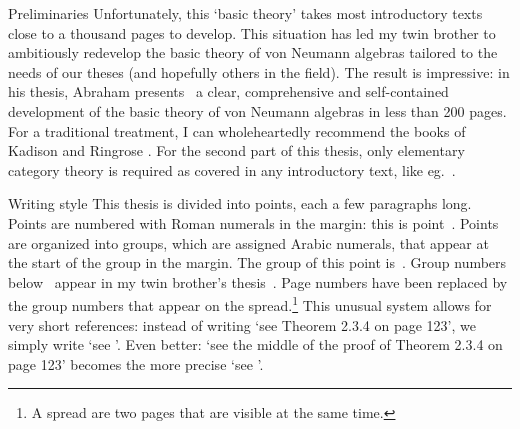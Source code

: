 \documentclass[b]{subfiles}
\begin{document}
\begin{parsec}
\begin{point}{Preliminaries}
Unfortunately, this `basic theory' takes most introductory texts
    close to a thousand pages to develop.
This situation has led my twin brother to ambitiously
     redevelop the basic theory of von Neumann algebras
     tailored to the needs of our theses (and hopefully others
     in the field).
The result is impressive:
    in his thesis, Abraham presents~\cite{bram}
    a clear, comprehensive and self-contained development of the basic
    theory of von Neumann algebras in less than 200 pages.
For a traditional treatment,
    I can wholeheartedly recommend the books of Kadison and Ringrose \cite{kr}.
For the second part of this thesis,
    only elementary category theory is required
    as covered in any introductory text, like eg.~\cite{awodey}.
\end{point}
\begin{point}{Writing style}%
This thesis is divided into points,
    each a few paragraphs long.
Points are numbered with Roman numerals in the margin:
    this is point~.
Points  are organized into groups,
    which are assigned Arabic numerals,
    that appear at the start of the group in the margin.
The group of this point is~.
Group numbers below~
    appear in my twin brother's thesis~\cite{bram}.
Page numbers have been replaced by the
    group numbers that appear on the spread.\footnote{%
        A spread are two pages that are visible at the same time.}
This unusual system allows for
    very short references:
    instead of writing `see Theorem 2.3.4 on page 123',
    we simply write `see '.
Even better: `see the middle of the proof of Theorem 2.3.4 on page 123'
    becomes the more precise `see '.


\end{point}
\end{parsec}
\end{document}
